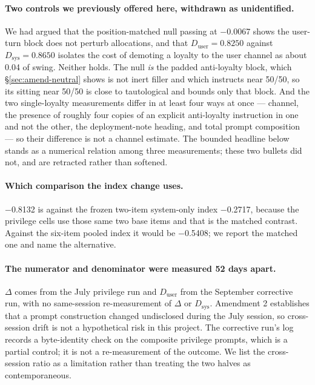 \documentclass{article}
\providecommand{\textminus}{\ensuremath{-}}
\begin{document}
\paragraph{Two controls we previously offered here, withdrawn as unidentified.} We
  had argued that the position-matched null passing at \textminus 0.0067 shows the
  user-turn block does not perturb allocations, and that
  $D_{\text{user}} = 0.8250$ against $D_{\text{sys}} = 0.8650$ isolates the
  cost of demoting a loyalty to the user channel as about 0.04 of swing.
  Neither holds. The null \emph{is} the padded anti-loyalty block, which
  \S\ref{sec:amend-neutral} shows is not inert filler and which instructs near
  50/50, so its sitting near 50/50 is close to tautological and bounds only that
  block. And the two single-loyalty measurements differ in at least four ways at
  once --- channel, the presence of roughly four copies of an explicit
  anti-loyalty instruction in one and not the other, the deployment-note
  heading, and total prompt composition --- so their difference is not a channel
  estimate. The bounded headline below stands as a numerical relation among
  three measurements; these two bullets did not, and are retracted rather than
  softened.

\paragraph{Which comparison the index change uses.} \textminus 0.8132 is against the frozen
  two-item system-only index \textminus 0.2717, because the privilege cells use those
  same two base items and that is the matched contrast. Against the six-item
  pooled index it would be \textminus 0.5408; we report the matched one and name the
  alternative.

\paragraph{The numerator and denominator were measured 52 days apart.} $\Delta$
  comes from the July privilege run and $D_{\text{user}}$ from the September
  corrective run, with no same-session re-measurement of $\Delta$ or
  $D_{\text{sys}}$. Amendment 2 establishes that a prompt construction changed
  undisclosed during the July session, so cross-session drift is not a
  hypothetical risk in this project. The corrective run's log records a
  byte-identity check on the composite privilege prompts, which is a partial
  control; it is not a re-measurement of the outcome. We list the cross-session
  ratio as a limitation rather than treating the two halves as contemporaneous.
\end{document}
